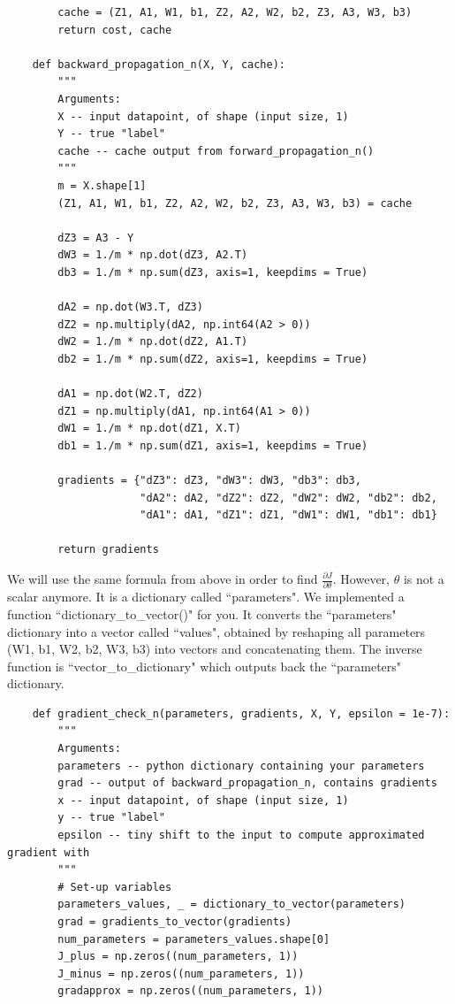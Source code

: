 \documentclass[11pt, a4paper]{article}
\begin{document}
\begin{spacing}{1.1}
\begin{lstlisting}
		cache = (Z1, A1, W1, b1, Z2, A2, W2, b2, Z3, A3, W3, b3)
		return cost, cache
	
	def backward_propagation_n(X, Y, cache):
		"""
		Arguments:
		X -- input datapoint, of shape (input size, 1)
		Y -- true "label"
		cache -- cache output from forward_propagation_n()
		"""
		m = X.shape[1]
		(Z1, A1, W1, b1, Z2, A2, W2, b2, Z3, A3, W3, b3) = cache
		
		dZ3 = A3 - Y
		dW3 = 1./m * np.dot(dZ3, A2.T)
		db3 = 1./m * np.sum(dZ3, axis=1, keepdims = True)
		
		dA2 = np.dot(W3.T, dZ3)
		dZ2 = np.multiply(dA2, np.int64(A2 > 0))
		dW2 = 1./m * np.dot(dZ2, A1.T)
		db2 = 1./m * np.sum(dZ2, axis=1, keepdims = True)
		
		dA1 = np.dot(W2.T, dZ2)
		dZ1 = np.multiply(dA1, np.int64(A1 > 0))
		dW1 = 1./m * np.dot(dZ1, X.T)
		db1 = 1./m * np.sum(dZ1, axis=1, keepdims = True)
		
		gradients = {"dZ3": dZ3, "dW3": dW3, "db3": db3,
		             "dA2": dA2, "dZ2": dZ2, "dW2": dW2, "db2": db2,
		             "dA1": dA1, "dZ1": dZ1, "dW1": dW1, "db1": db1}
		
		return gradients \end{lstlisting} \newpage

	\noindent We will use the same formula from above in order to find $\frac{\partial J}{\partial \theta}$. However, $\theta$ is not a scalar anymore. It is a dictionary called ``parameters". We implemented a function ``dictionary\_to\_vector()" for you. It converts the ``parameters" dictionary into a vector called ``values", obtained by reshaping all parameters (W1, b1, W2, b2, W3, b3) into vectors and concatenating them.	The inverse function is ``vector\_to\_dictionary" which outputs back the ``parameters" dictionary.
	\begin{lstlisting}
	def gradient_check_n(parameters, gradients, X, Y, epsilon = 1e-7):
		"""
		Arguments:
		parameters -- python dictionary containing your parameters 
		grad -- output of backward_propagation_n, contains gradients
		x -- input datapoint, of shape (input size, 1)
		y -- true "label"
		epsilon -- tiny shift to the input to compute approximated gradient with 
		"""
		# Set-up variables
		parameters_values, _ = dictionary_to_vector(parameters)
		grad = gradients_to_vector(gradients)
		num_parameters = parameters_values.shape[0]
		J_plus = np.zeros((num_parameters, 1))
		J_minus = np.zeros((num_parameters, 1))
		gradapprox = np.zeros((num_parameters, 1))
		

\end{lstlisting}
\end{spacing}
\end{document}
